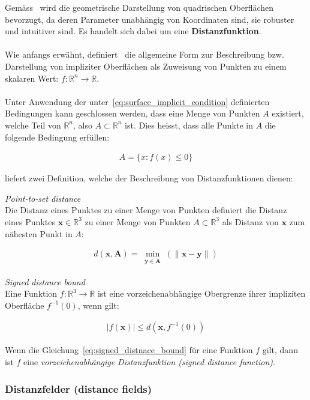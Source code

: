 Gemäss~\cite{hart_sphere_1994} wird die geometrische Darstellung von
quadrischen Oberflächen bevorzugt, da deren Parameter unabhängig von
Koordinaten sind, sie robuster und intuitiver sind. Es handelt sich dabei um
eine \textbf{Distanzfunktion}.\\
\\
Wie anfangs erwähnt, definiert~\cite{hart_sphere_1994} die allgemeine Form zur
Beschreibung bzw. Darstellung von impliziter Oberflächen als Zuweisung von
Punkten zu einem skalaren Wert: $ f : \mathbb{R}^{n} \to \mathbb{R} $.\\
\\
Unter Anwendung der unter~\ref{eq:surface_implicit_condition} definierten
Bedingungen kann geschlossen werden, dass eine Menge von Punkten $A$ existiert,
welche Teil von $\mathbb{R}^{n}$, also $A \subset \mathbb{R}^{n}$ ist. Dies heisst, dass alle Punkte in $A$ die folgende Bedingung erfüllen:

\begin{gather}
    A = \{ x : f(x) \leq 0 \}
\end{gather}

\cite{hart_sphere_1994} liefert zwei Definition, welche der Beschreibung von Distanzfunktionen dienen:

\theoremstyle{definition}
\begin{definition}{\label{theo:point_to_set_distance}
    \textit{Point-to-set distance}}\\
    Die Distanz eines Punktes zu einer Menge von Punkten definiert die Distanz
    eines Punktes $ \bm{x} \in \mathbb{R}^{3} $ zu einer Menge von Punkten $A
    \subset \mathbb{R}^{3}$ als Distanz von $\bm{x}$ zum nähesten Punkt in $A$:

    \begin{gather}
        d(\bm{x}, \bm{A}) = \min_{\substack{\bm{y} \in \bm{A}}}(\|\bm{x} - \bm{y}\|)
    \end{gather}
\end{definition}

\theoremstyle{definition}
\begin{definition}{\label{theo:signed_distnace_bound}
    \textit{Signed distance bound}}\\ 
    Eine Funktion $ f : \mathbb{R}^{3} \to \mathbb{R} $ ist eine
    vorzeichenabhängige Obergrenze ihrer impliziten Oberfläche $ f^{-1}(0)$,
    wenn gilt:

    \begin{gather}\label{eq:signed_distnace_bound}
        |f(\bm{x})| \leq d(\bm{x}, f^{-1}(0))
    \end{gather}
\end{definition}

Wenn die Gleichung~\ref{eq:signed_distnace_bound} für eine Funktion $f$ gilt,
dann ist $f$ eine \textit{vorzeichenabhängige Distanzfunktion (signed distance
    function)}.

\subsubsection{Distanzfelder (distance fields)}
\label{ssubsec:distance_fields}

